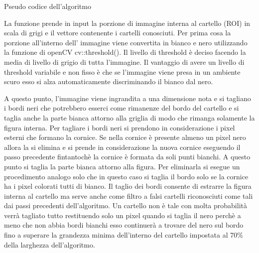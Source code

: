		\begin{algorithm}[htp]
		\SetAlgoLined
		\caption{Pseudo codice dell'algoritmo}
		\end{algorithm}

		La funzione prende in input la porzione di immagine interna al cartello (ROI) in scala di grigi e il vettore contenente i cartelli conosciuti. Per prima cosa la porzione all'interno dell' immagine viene convertita in bianco e nero utilizzando la funzione di openCV cv::threshold(). Il livello di threshold è deciso facendo la media di livello di grigio di tutta l'immagine. Il vantaggio di avere un livello di threshold variabile e non fisso è che se l'immagine viene presa in un ambiente scuro esso si alza automaticamente discriminando il bianco dal nero.
		
		A questo punto, l'immagine viene ingrandita a una dimensione nota e si tagliano i bordi neri che potrebbero esserci come rimanenze del bordo del cartello e si taglia anche la parte bianca attorno alla griglia di modo che rimanga solamente la figura interna. Per tagliare i bordi neri si prendono in considerazione i pixel esterni che formano la cornice. Se nella cornice è presente almeno un pixel nero allora la si elimina e si prende in considerazione la nuova cornice eseguendo il passo precedente fintantochè la cornice è formata da soli punti bianchi. A questo punto si taglia la parte bianca attorno alla figura. Per eliminarla si esegue un procedimento analogo solo che in questo caso si taglia il bordo solo se la cornice ha i pixel colorati tutti di bianco. Il taglio dei bordi consente di estrarre la figura interna al cartello ma serve anche come filtro a falsi cartelli riconosciuti come tali dai passi precedenti dell'algoritmo. Un cartello non è tale con molta probabilità verrà tagliato  tutto restituendo solo un pixel quando si taglia il nero perchè a meno che non abbia bordi bianchi esso continuerà a trovare del nero sul bordo fino a superare la grandezza minima dell'interno del cartello impostata al 70\% della larghezza dell'algoritmo.
		
